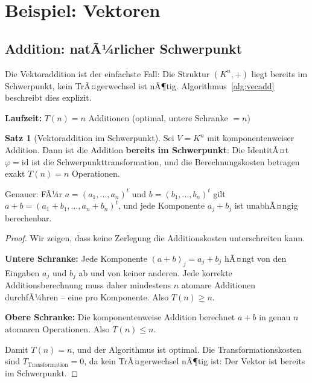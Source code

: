 ﻿\documentclass[a4paper,12pt]{report}
\theoremstyle{definition}
\newtheorem{satz}{Satz}
\begin{document}
\section{Beispiel: Vektoren}

\subsection*{Addition: natÃ¼rlicher Schwerpunkt}

Die Vektoraddition ist der einfachste Fall: Die Struktur $(K^n, +)$ liegt bereits im Schwerpunkt, kein TrÃ¤gerwechsel ist nÃ¶tig. Algorithmus~\ref{alg:vecadd} beschreibt dies explizit.


\begin{algorithm}[H]
\DontPrintSemicolon
\caption{Vektoraddition (im Schwerpunkt)}\label{alg:vecadd}
\;
\BlankLine
\textbf{Laufzeit:} $T(n) = n$ Additionen \quad (optimal, untere Schranke $= n$)
\end{algorithm}


\begin{satz}[Vektoraddition im Schwerpunkt]
    Sei $V = K^n$ mit komponentenweiser Addition. Dann ist
    die Addition \textbf{bereits im Schwerpunkt}: Die IdentitÃ¤t
    $\varphi = \mathrm{id}$ ist die Schwerpunkttransformation,
    und die Berechnungskosten betragen exakt $T(n) = n$ Operationen.

    Genauer: FÃ¼r $a = (a_1, \ldots, a_n)^t$ und $b = (b_1, \ldots, b_n)^t$
    gilt $a + b = (a_1 + b_1, \ldots, a_n + b_n)^t$, und jede Komponente
    $a_j + b_j$ ist unabhÃ¤ngig berechenbar.
\end{satz}

\begin{proof}
    Wir zeigen, dass keine Zerlegung die Additionskosten unterschreiten kann.

    \textbf{Untere Schranke:} Jede Komponente $(a+b)_j = a_j + b_j$
    hÃ¤ngt von den Eingaben $a_j$ und $b_j$ ab und von keiner anderen.
    Jede korrekte Additionsberechnung muss daher mindestens $n$ atomare
    Additionen durchfÃ¼hren -- eine pro Komponente.
    Also $T(n) \geq n$.

    \textbf{Obere Schranke:} Die komponentenweise Addition berechnet
    $a + b$ in genau $n$ atomaren Operationen.
    Also $T(n) \leq n$.

    Damit $T(n) = n$, und der Algorithmus ist optimal.
    Die Transformationskosten sind $T_{\mathrm{Transformation}} = 0$,
    da kein TrÃ¤gerwechsel nÃ¶tig ist: Der Vektor ist bereits im Schwerpunkt.
\end{proof}
\end{document}
